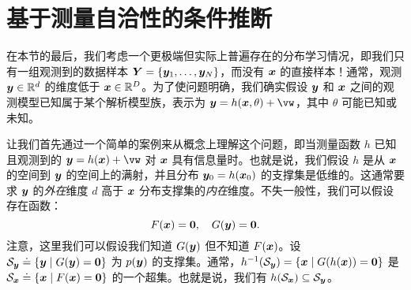 \documentclass[../../book-main_zh.tex]{subfiles}
\begin{document}



\section{基于测量自洽性的条件推断}
\label{sec:measurement-self-consistency}
在本节的最后，我们考虑一个更极端但实际上普遍存在的分布学习情况，即我们只有一组观测到的数据样本 $\bm{Y} = \{\bm{y}_1,\ldots, \bm{y}_N\}$，而没有 $\bm{x}$ 的直接样本！通常，观测 $\bm{y} \in \mathbb{R}^d$ 的维度低于 $\bm{x} \in \mathbb{R}^D$。为了使问题明确，我们确实假设 $\bm{y}$ 和 $\bm{x}$ 之间的观测模型已知属于某个解析模型族，表示为 $\y = h(\x, \theta) +\vw$，其中 $\theta$ 可能已知或未知。

让我们首先通过一个简单的案例来从概念上理解这个问题，即当测量函数 $h$ 已知且观测到的 $\y = h(\x) + \vw$ 对 $\bm{x}$ 具有信息量时。也就是说，我们假设 $h$ 是从 $\bm{x}$ 的空间到 $\bm{y}$ 的空间上的满射，并且分布 $\bm{y}_0 = h(\bm{x}_0)$ 的支撑集是低维的。这通常要求 $\bm{y}$ 的\textit{外在}维度 $d$ 高于 $\bm{x}$ 分布支撑集的\textit{内在}维度。不失一般性，我们可以假设存在函数：
\begin{equation}
F(\bm{x}) = \boldsymbol{0},\quad     G(\bm{y}) = \boldsymbol{0}.
\end{equation}
注意，这里我们可以假设我们知道 $G(\bm{y})$ 但不知道 $F(\bm{x})$。设 $\mathcal{S}_{\bm{y}} \doteq \{\bm{y} \mid G(\bm{y}) = \boldsymbol{0}\}$ 为 $p(\bm{y})$ 的支撑集。通常，$h^{-1}(\mathcal{S}_{\bm{y}}) = \{\bm{x} \mid G(h(\bm{x})) = \boldsymbol{0}\}$ 是 $\mathcal{S}_{\bm{x}} \doteq \{\bm{x} \mid F(\bm{x}) = \boldsymbol{0}\}$ 的一个超集。也就是说，我们有 $h(\mathcal{S}_{\bm{x}}) \subseteq \mathcal{S}_{\bm{y}}$。
\end{document}
